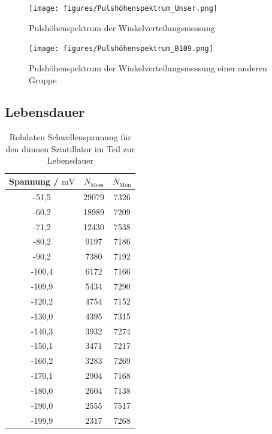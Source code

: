 \documentclass{article}
\begin{document}
\begin{figure}[H]
    \centering
    \texttt{[image: figures/Pulshöhenspektrum\_Unser.png]}
    \caption{Pulshöhenspektrum der Winkelverteilungsmessung}
    \label{fig:PulshoheWinkelverteilung}
\end{figure}
\begin{figure}[H]
    \centering
    \texttt{[image: figures/Pulshöhenspektrum\_B109.png]}
    \caption{Pulshöhenspektrum der Winkelverteilungsmessung einer anderen Gruppe}
    \label{fig:PulshoheWinkelverteilungAndereGruppe}
\end{figure}

\subsection*{Lebensdauer}

\begin{table}[H]
    \centering
    \caption{Rohdaten Schwellenspannung für den dünnen Szintillator im Teil zur Lebensdauer}
    \begin{tabular}{|c|c|c|}
        \hline
        Spannung / $\si{\milli\volt}$ & $N_\text{Mess}$ & $N_\text{Mon}$ \\ \hline \hline
        -51,5 & 29079 & 7326\\ \hline
        -60,2 & 18989 & 7209\\ \hline
        -71,2 & 12430 & 7538\\ \hline
        -80,2 & 9197 & 7186\\ \hline
        -90,2 & 7380 & 7192\\ \hline
        -100,4 & 6172 & 7166\\ \hline
        -109,9 & 5434 & 7290\\ \hline
        -120,2 & 4754 & 7152\\ \hline
        -130,0 & 4395 & 7315\\ \hline
        -140,3 & 3932 & 7274\\ \hline
        -150,1 & 3471 & 7217\\ \hline
        -160,2 & 3283 & 7269\\ \hline
        -170,1 & 2904 & 7168\\ \hline
        -180,0 & 2604 & 7138\\ \hline
        -190,0 & 2555 & 7517\\ \hline
        -199,9 & 2317 & 7268\\ \hline
    \end{tabular}
    \label{tab:RohdatenSchwellspannungLebensdauer}
\end{table}
\end{document}
